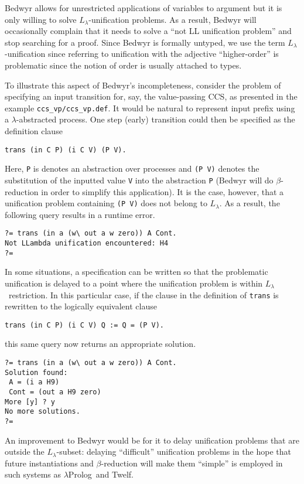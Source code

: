 \documentclass{article}
\newcommand{\lp}{$\lambda$Prolog}
\newcommand{\Ll}{$L_\lambda$}
\begin{document}
Bedwyr allows for unrestricted applications of variables to argument
but it is only willing to solve \Ll-unification problems.  As a result,
Bedwyr will occasionally complain that it needs to solve a ``not LL
unification problem'' and stop searching for a proof.  Since Bedwyr is
formally untyped, we use the term \Ll-unification since referring to
unification with the adjective ``higher-order'' is problematic since
the notion of order is usually attached to types.

To illustrate this aspect of Bedwyr's incompleteness, consider the
problem of specifying an input transition for, say, the value-passing
CCS, as presented in the example \verb+ccs_vp/ccs_vp.def+.  It would
be natural to represent input prefix using a $\lambda$-abstracted
process.  One step (early) transition could then be specified as the
definition clause
\begin{verbatim}
trans (in C P) (i C V) (P V).
\end{verbatim}
Here, {\tt P} is denotes an abstraction over processes and
\verb+(P V)+ denotes the substitution of the inputted value {\tt V}
into the abstraction {\tt P} (Bedwyr will do $\beta$-reduction in order
to simplify this application).  It is the case, however, that a
unification problem containing \verb+(P V)+ does not belong to \Ll.
As a result, the following query results in a runtime error.
\begin{verbatim}
?= trans (in a (w\ out a w zero)) A Cont.
Not LLambda unification encountered: H4
?=
\end{verbatim}
In some situations, a specification can be written so that the
problematic unification is delayed to a point where the unification
problem is within \Ll\ restriction.  In this particular case, if the clause
in the definition of {\tt trans} is rewritten to the logically
equivalent clause
\begin{verbatim}
trans (in C P) (i C V) Q := Q = (P V).
\end{verbatim}
this same query now returns an appropriate solution.
\begin{verbatim}
?= trans (in a (w\ out a w zero)) A Cont.
Solution found:
 A = (i a H9)
 Cont = (out a H9 zero)
More [y] ? y
No more solutions.
?=
\end{verbatim}
An improvement to Bedwyr would be for it to delay unification problems
that are outside the \Ll-subset: delaying ``difficult'' unification
problems in the hope that future instantiations and $\beta$-reduction
will make them ``simple'' is employed in such systems as \lp\ and
Twelf.
\end{document}
